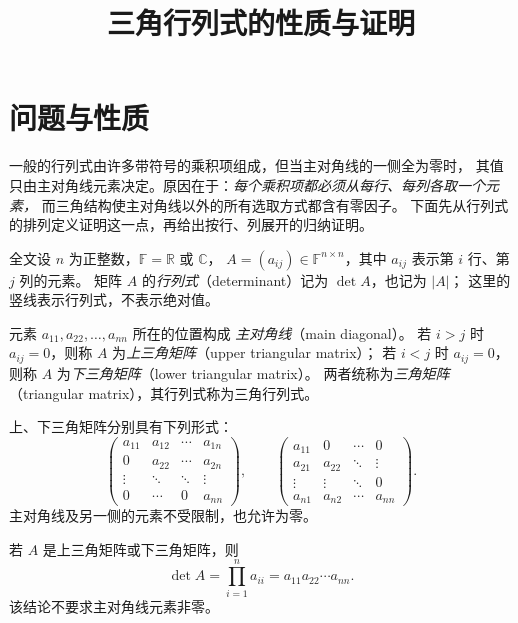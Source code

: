 \documentclass[UTF8,12pt,a4paper,fontset=fandol]{ctexart}
\title{三角行列式的性质与证明}
\author{}
\date{}
\begin{document}
\maketitle

\section{问题与性质}

一般的行列式由许多带符号的乘积项组成，但当主对角线的一侧全为零时，
其值只由主对角线元素决定。原因在于：\emph{每个乘积项都必须从每行、每列各取一个元素，}
而三角结构使主对角线以外的所有选取方式都含有零因子。
下面先从行列式的排列定义证明这一点，再给出按行、列展开的归纳证明。

全文设 $n$ 为正整数，$\mathbb F=\mathbb R$ 或 $\mathbb C$，
$A=(a_{ij})\in\mathbb F^{n\times n}$，其中 $a_{ij}$ 表示第 $i$ 行、第 $j$ 列的元素。
矩阵 $A$ 的\emph{行列式}（determinant）记为 $\det A$，也记为 $|A|$；
这里的竖线表示行列式，不表示绝对值。

\begin{definition}[三角矩阵]
元素 $a_{11},a_{22},\ldots,a_{nn}$ 所在的位置构成
\emph{主对角线}（main diagonal）。
若 $i>j$ 时 $a_{ij}=0$，则称 $A$ 为\emph{上三角矩阵}（upper triangular matrix）；
若 $i<j$ 时 $a_{ij}=0$，则称 $A$ 为\emph{下三角矩阵}（lower triangular matrix）。
两者统称为\emph{三角矩阵}（triangular matrix），其行列式称为三角行列式。
\end{definition}

上、下三角矩阵分别具有下列形式：
\[
  \begin{pmatrix}
    a_{11}&a_{12}&\cdots&a_{1n}\\
    0&a_{22}&\cdots&a_{2n}\\
    \vdots&\ddots&\ddots&\vdots\\
    0&\cdots&0&a_{nn}
  \end{pmatrix},
  \qquad
  \begin{pmatrix}
    a_{11}&0&\cdots&0\\
    a_{21}&a_{22}&\ddots&\vdots\\
    \vdots&\vdots&\ddots&0\\
    a_{n1}&a_{n2}&\cdots&a_{nn}
  \end{pmatrix}.
\]
主对角线及另一侧的元素不受限制，也允许为零。

\begin{theorem}[三角行列式的值]
\label{thm:triangular-determinant}
若 $A$ 是上三角矩阵或下三角矩阵，则
\begin{equation}
  \det A=\prod_{i=1}^{n}a_{ii}=a_{11}a_{22}\cdots a_{nn}.
  \label{eq:triangular-product}
\end{equation}
该结论不要求主对角线元素非零。
\end{theorem}
\end{document}
